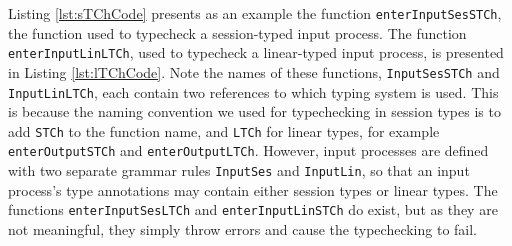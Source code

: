 \documentclass{l4proj}
\begin{document}
\quad Listing \ref{lst:sTChCode} presents as an example the function \texttt{enterInputSesSTCh}, the function used to typecheck a session-typed input process. The function \texttt{enterInputLinLTCh}, used to typecheck a linear-typed input process, is presented in Listing \ref{lst:lTChCode}. Note the names of these functions, \texttt{InputSesSTCh} and \texttt{InputLinLTCh}, each contain two references to which typing system is used. This is because the naming convention we used for typechecking in session types is to add \texttt{STCh} to the function name, and \texttt{LTCh} for linear types, for example \texttt{enterOutputSTCh} and \texttt{enterOutputLTCh}. However, input processes are defined with two separate grammar rules \texttt{InputSes} and \texttt{InputLin}, so that an input process's type annotations may contain either session types or linear types. The functions \texttt{enterInputSesLTCh} and \texttt{enterInputLinSTCh} do exist, but as they are not meaningful, they simply throw errors and cause the typechecking to fail.
\end{document}
